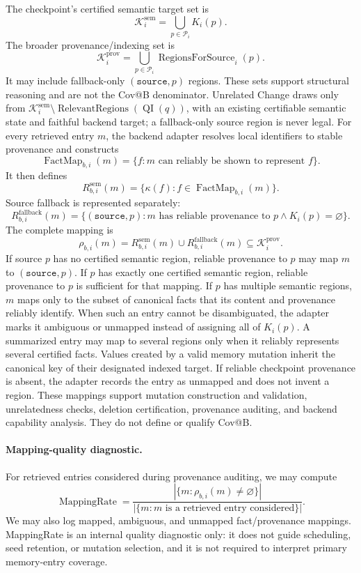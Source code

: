 The checkpoint's certified semantic target set is
\[
\mathcal{K}^{\mathrm{sem}}_i=
\bigcup_{p\in\mathcal{P}_i}K_i(p).
\]
The broader provenance/indexing set is
\[
\mathcal{K}^{\mathrm{prov}}_i=
\bigcup_{p\in\mathcal{P}_i}\operatorname{RegionsForSource}_i(p).
\]
It may include fallback-only \((\texttt{source},p)\) regions. These sets
support structural reasoning and are not the Cov@B denominator. Unrelated
Change draws only from
\(\mathcal{K}^{\mathrm{sem}}_i\setminus
\operatorname{RelevantRegions}(\operatorname{QI}(q))\), with an existing
certifiable semantic state and faithful backend target; a fallback-only source
region is never legal. For every retrieved entry \(m\), the backend adapter
resolves local identifiers to stable provenance and constructs
\[
\operatorname{FactMap}_{b,i}(m)=
\{f:m\text{ can reliably be shown to represent }f\}.
\]
It then defines
\[
R^{\mathrm{sem}}_{b,i}(m)=
\{\kappa(f):f\in\operatorname{FactMap}_{b,i}(m)\}.
\]
Source fallback is represented separately:
\[
R^{\mathrm{fallback}}_{b,i}(m)=
\{(\texttt{source},p):m\text{ has reliable provenance to }p
\land K_i(p)=\varnothing\}.
\]
The complete mapping is
\[
\rho_{b,i}(m)=R^{\mathrm{sem}}_{b,i}(m)\cup
R^{\mathrm{fallback}}_{b,i}(m)\subseteq
\mathcal{K}^{\mathrm{prov}}_i.
\]
If source \(p\) has no certified semantic region, reliable provenance to
\(p\) may map \(m\) to \((\texttt{source},p)\). If \(p\) has exactly one
certified semantic region, reliable provenance to \(p\) is sufficient for
that mapping. If \(p\) has multiple semantic regions, \(m\) maps only to the
subset of canonical facts that its content and provenance reliably identify.
When such an entry cannot be disambiguated, the adapter marks it ambiguous or
unmapped instead of assigning all of \(K_i(p)\). A summarized
entry may map to several regions only when it reliably represents several
certified facts. Values created by a valid memory mutation inherit the
canonical key of their designated indexed target. If reliable checkpoint
provenance is absent, the adapter records the entry as unmapped and does not
invent a region. These mappings support mutation construction and validation,
unrelatedness checks, deletion certification, provenance auditing, and backend
capability analysis. They do not define or qualify Cov@B.

\paragraph{Mapping-quality diagnostic.}
For retrieved entries considered during provenance auditing, we may compute
\[
\operatorname{MappingRate}=
\frac{|\{m:\rho_{b,i}(m)\neq\varnothing\}|}
{|\{m:m\text{ is a retrieved entry considered}\}|}.
\]
We may also log mapped, ambiguous, and unmapped fact/provenance mappings.
MappingRate is an internal quality diagnostic only: it does not guide
scheduling, seed retention, or mutation selection, and it is not required to
interpret primary memory-entry coverage.

